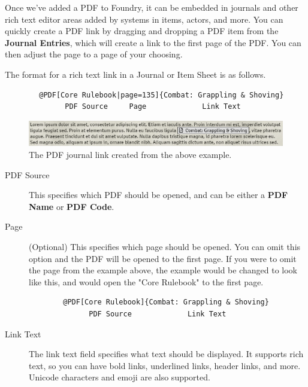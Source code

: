 \documentclass{article}
\begin{document}
    Once we've added a PDF to Foundry, it can be embedded in journals and other rich text editor areas added by systems in items, actors, and more. You can quickly create a PDF link by dragging and dropping a PDF item from the \textbf{Journal Entries}, which will create a link to the first page of the PDF. You can then adjust the page to a page of your choosing.

    The format for a rich text link in a Journal or Item Sheet is as follows.

    \begin{verbatim}
        @PDF[Core Rulebook|page=135]{Combat: Grappling & Shoving}
              PDF Source     Page             Link Text
    \end{verbatim}

    \begin{figure}[h]
        \centering
        \includegraphics[width=1\textwidth]{images/rich-text-link-example.png}
        \caption{The PDF journal link created from the above example.}
        \label{rich-text-link-example}
    \end{figure}

    \begin{description}

        \item [PDF Source] This specifies which PDF should be opened, and can be either a \textbf{PDF Name} or \textbf{PDF Code}.

        \item [Page] (Optional) This specifies which page should be opened. You can omit this option and the PDF will be opened to the first page. If you were to omit the page from the example above, the example would be changed to look like this, and would open the "Core Rulebook" to the first page.

        \begin{verbatim}
        @PDF[Core Rulebook]{Combat: Grappling & Shoving}
              PDF Source             Link Text
        \end{verbatim}

        \item [Link Text] The link text field specifies what text should be displayed. It supports rich text, so you can have bold links, underlined links, header links, and more. Unicode characters and emoji are also supported.

    \end{description}
\end{document}
